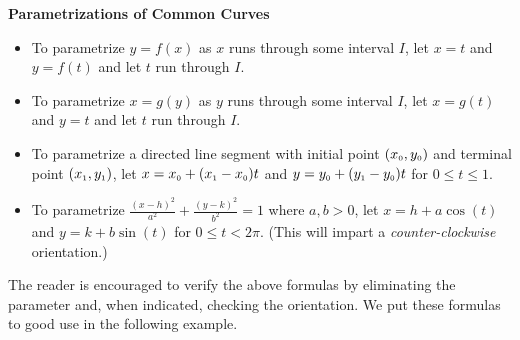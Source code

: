 \colorbox{ResultColor}{\bbm

\label{commonparametrizations}


\centerline{\textbf{Parametrizations of Common Curves}}

\begin{itemize}

\item  To parametrize $y=f(x)$ as $x$ runs through some interval $I$, let $x=t$ and $y=f(t)$ and let $t$ run through $I$.

\item  To parametrize $x=g(y)$ as $y$ runs through some interval $I$, let $x=g(t)$ and $y=t$ and let $t$ run through $I$.

\item  To parametrize a directed line segment with initial point $(x_{\text{\tiny$0$}}, y_{\text{\tiny$0$}})$ and terminal point $(x_{\text{\tiny$1$}}, y_{\text{\tiny$1$}})$, let $x = x_{\text{\tiny$0$}} + (x_{\text{\tiny$1$}} - x_{\text{\tiny$0$}}) t$ and $y = y_{\text{\tiny$0$}} + (y_{\text{\tiny$1$}} - y_{\text{\tiny$0$}}) t$ for $0 \leq t \leq 1$.

\item  To parametrize  $\frac{(x-h)^2}{a^2} + \frac{(y-k)^2}{b^2} = 1$ where $a,b > 0$, let $x = h+a\cos(t)$ and $y=k+b\sin(t)$ for $0 \leq t < 2\pi$.  (This will impart a \textit{counter-clockwise} orientation.)

\end{itemize}

\ebm}

\smallskip

The reader is encouraged to verify the above formulas by eliminating the parameter and, when indicated, checking the orientation.  We put these formulas to good use in the following example.

